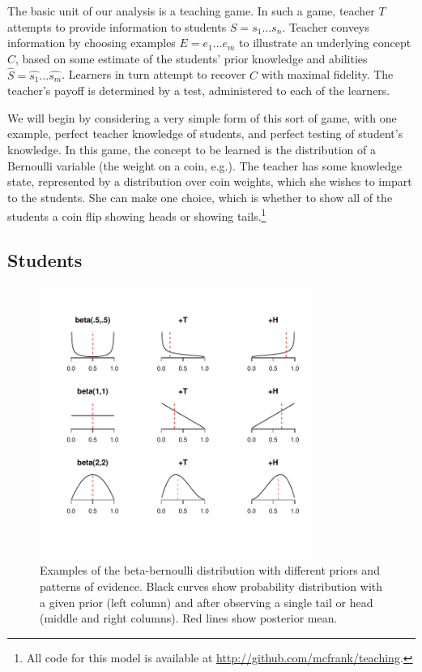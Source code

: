 \documentclass[10pt,letterpaper]{article}
\begin{document}
The basic unit of our analysis is a teaching game. In such a game, teacher $T$ attempts to provide information to students $S = {s_1 ... s_n}$. Teacher conveys information by choosing examples $E = {e_1 ... e_m}$ to illustrate an underlying concept $C$, based on some estimate of the students' prior knowledge and abilities $\hat{S} = {\hat{s_1} ... \hat{s_m}}$. Learners in turn attempt to recover $C$ with maximal fidelity. The teacher's payoff is determined by a test, administered to each of the learners. 

We will begin by considering a very simple form of this sort of game, with one example, perfect teacher knowledge of students, and perfect testing of student's knowledge. In this game, the concept to be learned is the distribution of a Bernoulli variable (the weight on a coin, e.g.). The teacher has some knowledge state, represented by a distribution over coin weights, which she wishes to impart to the students. She can make one choice, which is whether to show all of the students a coin flip showing heads or showing tails.\footnote{All code for this model is available at \url{http://github.com/mcfrank/teaching}.}

\subsection{Students}

\begin{figure}[t]
\begin{center}
\includegraphics[width=3.5in]{figures/students.pdf}
\end{center}
\caption{\label{fig:students} Examples of the beta-bernoulli distribution with different priors and patterns of evidence. Black curves show probability distribution with a given prior (left column) and after observing a single tail or head (middle and right columns). Red lines show posterior mean.}
\end{figure}
\end{document}
